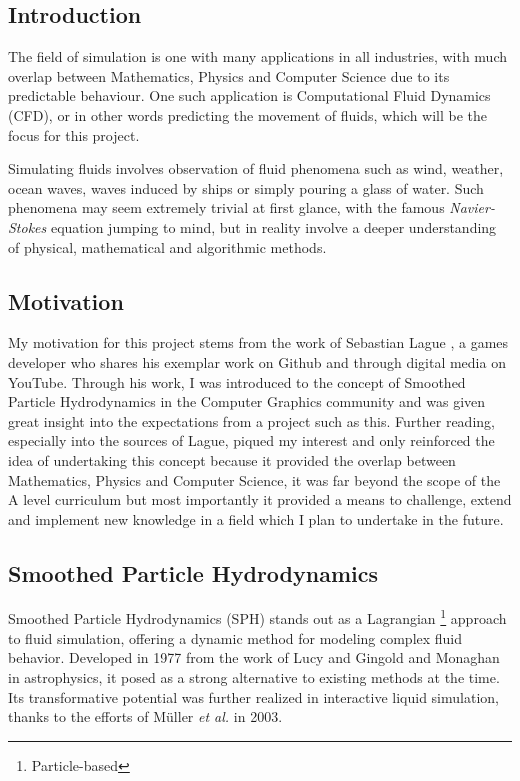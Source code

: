 \documentclass[a4paper,11pt]{article}
\begin{document}
\begin{multicols}{2}
\section{Introduction}
The field of simulation is one with many applications in all industries, with much overlap between Mathematics, Physics and Computer Science due to its predictable behaviour. One such application is Computational Fluid Dynamics (CFD), or in other words predicting the movement of fluids, which will be the focus for this project.

Simulating fluids involves observation of fluid phenomena such as wind, weather, ocean waves, waves induced by ships or simply pouring a glass of water. Such phenomena may seem extremely trivial at first glance, with the famous \textit{Navier-Stokes} equation jumping to mind, but in reality involve a deeper understanding of physical, mathematical and algorithmic methods.

\subsection{Motivation}

My motivation for this project stems from the work of Sebastian Lague \cite{Lague}, a games developer who shares his exemplar work on Github and through digital media on YouTube. Through his work, I was introduced to the concept of Smoothed Particle Hydrodynamics in the Computer Graphics community and was given great insight into the expectations from a project such as this. Further reading, especially into the sources of Lague, piqued my interest and only reinforced the idea of undertaking this concept because it provided the overlap between Mathematics, Physics and Computer Science, it was far beyond the scope of the A level curriculum but most importantly it provided a means to challenge, extend and implement new knowledge in a field which I plan to undertake in the future.

\subsection{Smoothed Particle Hydrodynamics}
Smoothed Particle Hydrodynamics (SPH) stands out as a Lagrangian \footnote{Particle-based} approach to fluid simulation, offering a dynamic method for modeling complex fluid behavior. Developed in 1977 from the work of Lucy \cite{lucy} and Gingold and Monaghan \cite{gingold} in astrophysics, it posed as a strong alternative to existing methods at the time. Its transformative potential was further realized in interactive liquid simulation, thanks to the efforts of Müller \textit{et al.} \cite{muller} in 2003.


\end{multicols}
\end{document}
